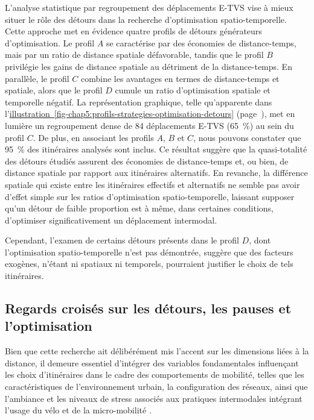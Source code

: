 \begin{refsegment}
L'analyse statistique par regroupement des déplacements \acrshort{E-TVS} vise à mieux situer le rôle des détours dans la recherche d'optimisation spatio-temporelle. Cette approche met en évidence quatre profils de détours générateurs d'optimisation. Le profil \(A\) se caractérise par des économies de distance-temps, mais par un ratio de distance spatiale défavorable, tandis que le profil \(B\) privilégie les gains de distance spatiale au détriment de la distance-temps. En parallèle, le profil \(C\) combine les avantages en termes de distance-temps et spatiale, alors que le profil \(D\) cumule un ratio d'optimisation spatiale et temporelle négatif. La représentation graphique, telle qu'apparente dans l'\hyperref[fig-chap5:profils-strategies-optimisation-detours]{illustration~\ref{fig-chap5:profils-strategies-optimisation-detours}} (page~\pageref{fig-chap5:profils-strategies-optimisation-detours}), met en lumière un regroupement dense de 84 déplacements \acrshort{E-TVS} (65~\%) au sein du profil \(C\). De plus, en associant les profils \(A\), \(B\) et \(C\), nous pouvons constater que 95~\% des itinéraires analysés sont inclus. Ce résultat suggère que la quasi-totalité des détours étudiés assurent des économies de distance-temps et, ou bien, de distance spatiale par rapport aux itinéraires alternatifs. En revanche, la différence spatiale qui existe entre les itinéraires effectifs et alternatifs ne semble pas avoir d'effet simple sur les ratios d'optimisation spatio-temporelle, laissant supposer qu'un détour de faible proportion est à même, dans certaines conditions, d'optimiser significativement un déplacement intermodal.%

Cependant, l'examen de certains détours présents dans le profil \(D\), dont l'optimisation spatio-temporelle n'est pas démontrée, suggère que des facteurs exogènes, n'étant ni spatiaux ni temporels, pourraient justifier le choix de tels itinéraires.%

\subsection{Regards croisés sur les détours, les pauses et l'optimisation
    \label{chap5:discussion-detours-pauses-optimisation}
    }

Bien que cette recherche ait délibérément mis l'accent sur les dimensions liées à la distance, il demeure essentiel d'intégrer des variables fondamentales influençant les choix d'itinéraires dans le cadre des comportements de mobilité, telles que les caractéristiques de l'environnement urbain, la configuration des réseaux, ainsi que l'ambiance et les niveaux de stress associés aux pratiques intermodales intégrant l'usage du vélo et de la micro-mobilité \textcolor{blue}{\autocite[79]{zuo_incorporating_2021}}.%


\end{refsegment}
